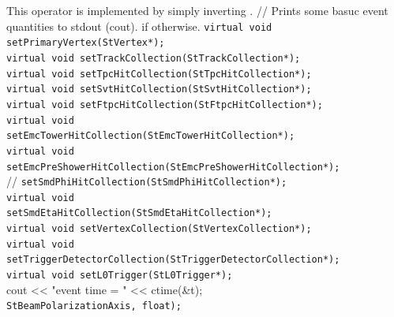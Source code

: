     This operator is implemented by simply inverting .
//   Prints some basuc event quantities to stdout (cout).
    if otherwise. 
    \verb+virtual void setPrimaryVertex(StVertex*);+\\
    
    \verb+virtual void setTrackCollection(StTrackCollection*);+\\
    \verb+virtual void setTpcHitCollection(StTpcHitCollection*);+\\
    \verb+virtual void setSvtHitCollection(StSvtHitCollection*);+\\
    \verb+virtual void setFtpcHitCollection(StFtpcHitCollection*);+\\
    \verb+virtual void+\\
    \verb+setEmcTowerHitCollection(StEmcTowerHitCollection*);+\\
    \verb+virtual void+\\
    \verb+setEmcPreShowerHitCollection(StEmcPreShowerHitCollection*);+\\
//   
    \verb+setSmdPhiHitCollection(StSmdPhiHitCollection*);+\\
    \verb+virtual void+\\
    \verb+setSmdEtaHitCollection(StSmdEtaHitCollection*);+\\
    \verb+virtual void setVertexCollection(StVertexCollection*);+\\
    \verb+virtual void+\\
    \verb+setTriggerDetectorCollection(StTriggerDetectorCollection*);+\\
    \verb+virtual void setL0Trigger(StL0Trigger*);+\\
     cout << "event time = " << ctime(&t);     
    \verb+                         StBeamPolarizationAxis, float);+\\

